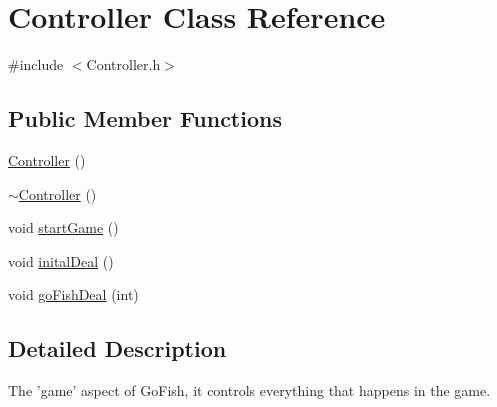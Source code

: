 \hypertarget{class_controller}{\section{Controller Class Reference}
\label{class_controller}
}


{\ttfamily \#include $<$Controller.\-h$>$}

\subsection*{Public Member Functions}
\begin{DoxyCompactItemize}
\item 
\hyperlink{class_controller_a95c56822d667e94b031451729ce069a9}{Controller} ()
\item 
\hyperlink{class_controller_a0ab87934c4f7a266cfdb86e0f36bc1b5}{$\sim$\-Controller} ()
\item 
void \hyperlink{class_controller_a3a9e81ea10c63eea81c2612ba3beb5c4}{start\-Game} ()
\item 
void \hyperlink{class_controller_aa2a6716682fa463fc3d6bbdb510630e5}{inital\-Deal} ()
\item 
void \hyperlink{class_controller_aa93207ee72313ca40934a10bf36adca9}{go\-Fish\-Deal} (int)
\end{DoxyCompactItemize}


\subsection{Detailed Description}
The 'game' aspect of Go\-Fish, it controls everything that happens in the game. 

